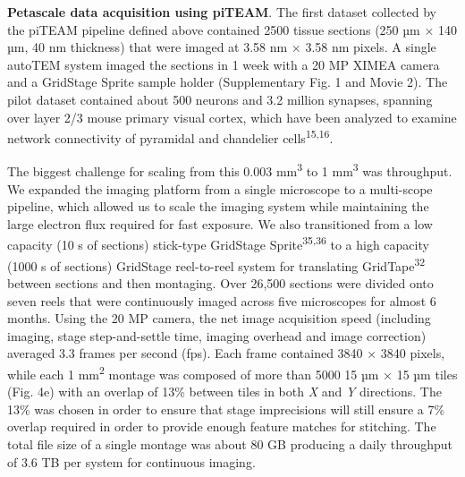 \documentclass{article}
\begin{document}
\noindent\textbf{Petascale data acquisition using piTEAM}. The first dataset collected by the piTEAM pipeline defined above contained 2500 tissue sections (250 µm × 140 µm, 40 nm thickness) that were imaged at 3.58 nm × 3.58 nm pixels. A single autoTEM system imaged the sections in 1 week with a 20 MP XIMEA camera and a GridStage Sprite sample holder (Supplementary Fig. 1 and Movie 2). The pilot dataset contained about 500 neurons and 3.2 million synapses, spanning over layer 2/3 mouse primary visual cortex, which have been analyzed to examine network connectivity of pyramidal and chandelier cells\textsuperscript{15,16}.

The biggest challenge for scaling from this 0.003 mm\textsuperscript{3} to 1 mm\textsuperscript{3} was throughput. We expanded the imaging platform from a single microscope to a multi-scope pipeline, which allowed us to scale the imaging system while maintaining the large electron flux required for fast exposure. We also transitioned from a low capacity (10 s of sections) stick-type GridStage Sprite\textsuperscript{35,36} to a high capacity (1000 s of sections) GridStage reel-to-reel system for translating GridTape\textsuperscript{32} between sections and then montaging. Over 26,500 sections were divided onto seven reels that were continuously imaged across five microscopes for almost 6 months. Using the 20 MP camera, the net image acquisition speed (including imaging, stage step-and-settle time, imaging overhead and image correction) averaged 3.3 frames per second (fps). Each frame contained 3840 × 3840 pixels, while each 1 mm\textsuperscript{2} montage was composed of more than 5000 15 µm × 15 µm tiles (Fig. 4e) with an overlap of 13\% between tiles in both \emph{X} and \emph{Y} directions. The 13\% was chosen in order to ensure that stage imprecisions will still ensure a 7\% overlap required in order to provide enough feature matches for stitching. The total file size of a single montage was about 80 GB producing a daily throughput of 3.6 TB per system for continuous imaging.
\end{document}
